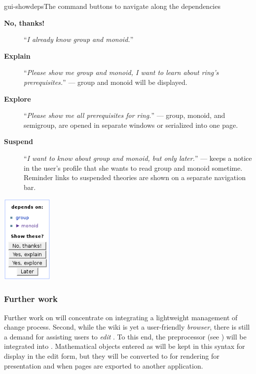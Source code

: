 \begin{myfig}{gui-showdeps}{The command buttons to navigate along the dependencies}
  \begin{minipage}{8cm}
\begin{description}
\item[{\bf{No, thanks!}}] ``{\emph{I already know group and monoid.}}''
\item[{\bf{Explain}}] ``{\emph{Please show me group and monoid, I want to learn about
      ring's prerequisites.}}'' --- group and monoid will be displayed.
\item[{\bf{Explore}}] ``{\emph{Please show me {\emph{all}} prerequisites for ring.}}'' ---
  group, monoid, and semigroup, are opened in separate windows or serialized into one
  page.
\item[{\bf{Suspend}}] ``{\emph{I want to know about group and monoid, but only later.}}''
  --- {\swim} keeps a notice in the user's profile that she wants to read group and monoid
  sometime.  Reminder links to suspended theories are shown on a separate navigation bar.
\end{description}
\end{minipage}\quad
\begin{minipage}{2.5cm}
  \includegraphics[width=2.5cm]{projects/swim/gui-showdeps}
\end{minipage}
\end{myfig}

\subsubsection{Further work}

Further work on {\swim} will concentrate on integrating a lightweight
management of change process.  Second, while the wiki is yet a user-friendly
\emph{browser}, there is still a demand for assisting users to \emph{edit}
{\omdoc}.  To this end, the {\qmath} preprocessor (see {}) will
be integrated into {\swim}.  Mathematical objects entered as {\qmath} will be
kept in this syntax for display in the edit form, but they will be converted to
{\omdoc} for rendering for presentation and when pages are exported to another
application.


